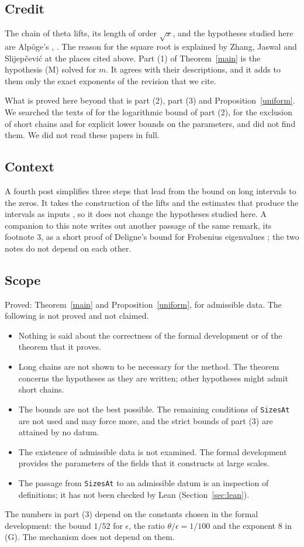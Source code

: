 \documentclass[11pt]{amsart}
\theoremstyle{definition}
\theoremstyle{remark}
\newcommand{\src}[1]{\texttt{#1}}
\newcommand{\tagM}{\textup{(M)}}
\newcommand{\tagG}{\textup{(G)}}
\begin{document}
\subsection{Credit}
The chain of theta lifts, its length of order $\sqrt x$, and the hypotheses studied here are Alp\"oge's \cite[step 8]{remark}, \cite{archive}. The reason for the square root is explained by Zhang, Jaswal and Slijep\v{c}evi\'c at the places cited above. Part (1) of Theorem~\ref{main} is the hypothesis \tagM{} solved for $m$. It agrees with their descriptions, and it adds to them only the exact exponents of the revision that we cite.

What is proved here beyond that is part (2), part (3) and Proposition~\ref{uniform}. We searched the texts of \cite{Jaswal,Zhang,Slijepcevic,Three} for the logarithmic bound of part (2), for the exclusion of short chains and for explicit lower bounds on the parameters, and did not find them. We did not read these papers in full.

\subsection{Context}
A fourth post simplifies three steps that lead from the bound on long intervals to the zeros. It takes the construction of the lifts and the estimates that produce the intervals as inputs \cite[p.~1]{Three}, so it does not change the hypotheses studied here. A companion to this note writes out another passage of the same remark, its footnote 3, as a short proof of Deligne's bound for Frobenius eigenvalues \cite{DeligneNote}; the two notes do not depend on each other.

\subsection{Scope}
Proved: Theorem~\ref{main} and Proposition~\ref{uniform}, for admissible data. The following is not proved and not claimed.
\begin{itemize}
\item Nothing is said about the correctness of the formal development or of the theorem that it proves.
\item Long chains are not shown to be necessary for the method. The theorem concerns the hypotheses as they are written; other hypotheses might admit short chains.
\item The bounds are not the best possible. The remaining conditions of \src{SizesAt} are not used and may force more, and the strict bounds of part (3) are attained by no datum.
\item The existence of admissible data is not examined. The formal development provides the parameters of the fields that it constructs at large scales.
\item The passage from \src{SizesAt} to an admissible datum is an inspection of definitions; it has not been checked by Lean (Section~\ref{sec:lean}).
\end{itemize}
The numbers in part (3) depend on the constants chosen in the formal development: the bound $1/52$ for $\epsilon$, the ratio $\theta/\epsilon=1/100$ and the exponent $8$ in \tagG. The mechanism does not depend on them.
\end{document}
